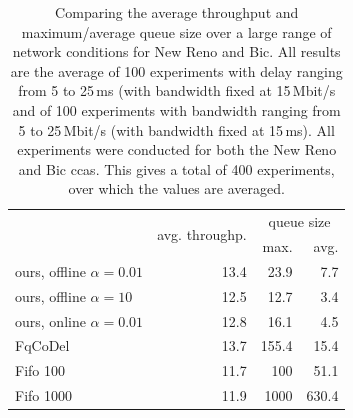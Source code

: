 \documentclass[conference]{IEEEtran}
\begin{document}
\begin{table}
\caption{Comparing the average throughput and maximum/average queue size over a large range of network conditions for New Reno and Bic. All results are the average of 100 experiments with delay ranging from 5 to 25\,ms (with bandwidth fixed at 15\,Mbit/s and of 100 experiments with bandwidth ranging from 5 to 25\,Mbit/s (with bandwidth fixed at 15\,ms). All experiments were conducted for both the New Reno and Bic \glspl{cca}. This gives a total of 400 experiments, over which the values are averaged.} \label{tab:comparison_others}
\centering
\begin{tabular}{l r r r} \toprule
& \multirow{2}{*}{avg. throughp.} & \multicolumn{2}{c}{queue size} \\
& & max. & avg. \\ \midrule
\gls{ours}, offline $\alpha=0.01$ & 13.4 & 23.9 & 7.7\\
\gls{ours}, offline $\alpha=10$ & 12.5 & 12.7 & 3.4\\
\gls{ours}, online $\alpha=0.01$ & 12.8 & 16.1 & 4.5\\
FqCoDel	& 13.7 & 155.4 & 15.4\\
Fifo 100	& 11.7 & 100 & 51.1\\
Fifo 1000	& 11.9 & 1000 & 630.4 \\
\bottomrule
\end{tabular}
\end{table}

\end{document}
